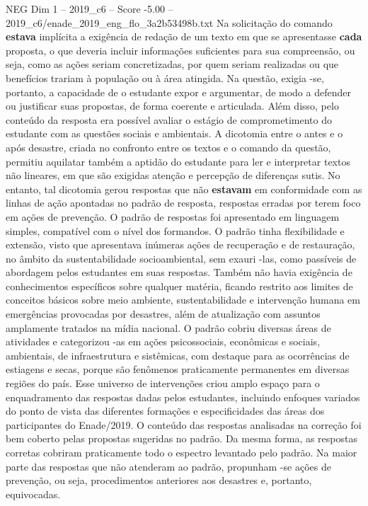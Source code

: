 \begin{textsample}{NEG Dim 1 – 2019\_c6 – Score -5.00 – 2019\_c6/enade\_2019\_eng\_flo\_3a2b53498b.txt}
Na solicitação do comando \textbf{estava} implícita a exigência de redação de um texto em que se apresentasse \textbf{cada} proposta, o que deveria incluir informações suficientes para sua compreensão, ou seja, como as ações seriam concretizadas, por quem seriam realizadas ou que benefícios trariam à população ou à área atingida.
Na questão, exigia -se, portanto, a capacidade de o estudante expor e argumentar, de modo a defender ou justificar suas propostas, de forma coerente e articulada.
Além disso, pelo conteúdo da resposta era possível avaliar o estágio de comprometimento do estudante com as questões sociais e ambientais.
A dicotomia entre o antes e o após desastre, criada no confronto entre os textos e o comando da questão, permitiu aquilatar também a aptidão do estudante para ler e interpretar textos não lineares, em que são exigidas atenção e percepção de diferenças sutis.
No entanto, tal dicotomia gerou respostas que não \textbf{estavam} em conformidade com as linhas de ação apontadas no padrão de resposta, respostas erradas por terem foco em ações de prevenção.
O padrão de respostas foi apresentado em linguagem simples, compatível com o nível dos formandos.
O padrão tinha flexibilidade e extensão, visto que apresentava inúmeras ações de recuperação e de restauração, no âmbito da sustentabilidade socioambiental, sem exauri -las, como passíveis de abordagem pelos estudantes em suas respostas.
Também não havia exigência de conhecimentos específicos sobre qualquer matéria, ficando restrito aos limites de conceitos básicos sobre meio ambiente, sustentabilidade e intervenção humana em emergências provocadas por desastres, além de atualização com assuntos amplamente tratados na mídia nacional.
O padrão cobriu diversas áreas de atividades e categorizou -as em ações psicossociais, econômicas e sociais, ambientais, de infraestrutura e sistêmicas, com destaque para as ocorrências de estiagens e secas, porque são fenômenos praticamente permanentes em diversas regiões do país.
Esse universo de intervenções criou amplo espaço para o enquadramento das respostas dadas pelos estudantes, incluindo enfoques variados do ponto de vista das diferentes formações e especificidades das áreas dos participantes do Enade/2019.
O conteúdo das respostas analisadas na correção foi bem coberto pelas propostas sugeridas no padrão.
Da mesma forma, as respostas corretas cobriram praticamente todo o espectro levantado pelo padrão.
Na maior parte das respostas que não atenderam ao padrão, propunham -se ações de prevenção, ou seja, procedimentos anteriores aos desastres e, portanto, equivocadas.

\end{textsample}
